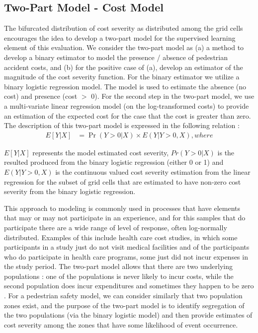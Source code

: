 \documentclass{llncs}
\begin{document}
\subsection{Two-Part Model - Cost Model}

The bifurcated distribution of cost severity as distributed among the grid cells encourages the idea to develop a two-part model for the supervised learning element of this evaluation. We consider the two-part model as (a) a method to develop a binary estimator to model the presence / absence of pedestrian accident costs, and (b) for the positive case of (a), develop an estimator of the magnitude of the cost severity function.
For the binary estimator we utilize a binary logistic regression model. The model is used to estimate the absence (no cost) and presence (cost $>$ 0). For the second step in the two-part model, we use a multi-variate linear regression model (on the log-transformed costs) to provide an estimation of the expected cost for the case that the cost is greater than zero. The description of this two-part model is expressed in the following relation : 
% 
\begin{align}
E[Y| X] &= \Pr(Y > 0 | X)\times E(Y | Y > 0,  X), where
\end{align}

$E{[Y|X]}$ represents the model estimated cost severity, $Pr(Y > 0 | X)$ is the resulted produced from the binary logistic regression (either 0 or 1) and $E(Y | Y > 0,  X)$ is the continuous valued cost severity estimation from the linear regression for the subset of grid cells that are estimated to have non-zero cost severity from the binary logistic regression.

This approach to modeling is commonly used in processes that have elements that may or may not participate in an experience, and for this samples that do participate there are a wide range of level of response, often log-normally distributed. Examples of this include health care cost studies, in which some participants in a study just do not visit medical facilities and of the participants who do participate in health care programs, some just did not incur expenses in the study period. The two-part model allows that there are two underlying populations : one of the populations is never likely to incur costs, while the second population does incur expenditures and sometimes they happen to be zero \cite{bun2004too}. For a pedestrian safety model, we can consider similarly that two population zones exist, and the purpose of the two-part model is to identify segregation of the two populations (via the binary logistic model) and then provide estimates of cost severity among the zones that have some likelihood of event occurrence.
\end{document}
